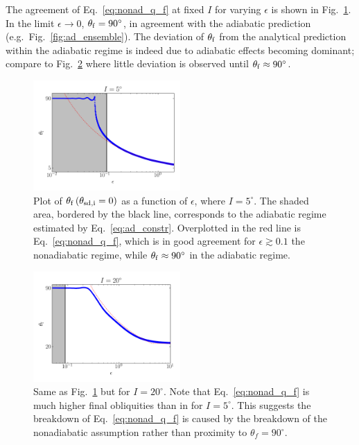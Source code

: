 \documentclass[
        fleqn,
        usenatbib,
    ]{mnras}
\newcommand*{\p}[1]{\left(#1\right)}
\begin{document}
The agreement of Eq.~\eqref{eq:nonad_q_f} at fixed $I$ for varying $\epsilon$ is
shown in Fig.~\ref{fig:nonad_3_scan}. In the limit $\epsilon \to 0$,
$\theta_{\rm f} = 90^\circ$, in agreement with the adiabatic prediction (e.g.\
Fig.~\ref{fig:ad_ensemble}). The deviation of $\theta_{\rm f}$ from the
analytical prediction within the adiabatic regime is indeed due to adiabatic
effects becoming dominant; compare to Fig.~\ref{fig:nonad_3_scan_20} where
little deviation is observed until $\theta_{\rm f} \approx 90^\circ$.
\begin{figure}
    \centering
    \includegraphics[width=0.5\textwidth]{plots_diskdisp/3scan.png}
    \caption{Plot of $\theta_{\rm  f}\p{\theta_{\rm sd, i} = 0}$ as a function
    of $\epsilon$, where $I = 5^\circ$. The shaded area, bordered by the black
    line, corresponds to the adiabatic regime estimated by
    Eq.~\eqref{eq:ad_constr}. Overplotted in the red line is
    Eq.~\eqref{eq:nonad_q_f}, which is in good agreement for $\epsilon \gtrsim
    0.1$ the nonadiabatic regime, while $\theta_{\rm f} \approx 90^\circ$ in
    the adiabatic regime.}\label{fig:nonad_3_scan}
\end{figure}
\begin{figure}
    \centering
    \includegraphics[width=0.5\textwidth]{plots_diskdisp/3scan_20.png}
    \caption{Same as Fig.~\ref{fig:nonad_3_scan} but for $I=20^\circ$. Note that
    Eq.~\eqref{eq:nonad_q_f} is much higher final obliquities than
    in for $I = 5^\circ$. This suggests the breakdown of
    Eq.~\eqref{eq:nonad_q_f} is caused by the breakdown of the nonadiabatic
    assumption rather than proximity to $\theta_f =
    90^\circ$.}\label{fig:nonad_3_scan_20}
\end{figure}
\end{document}
